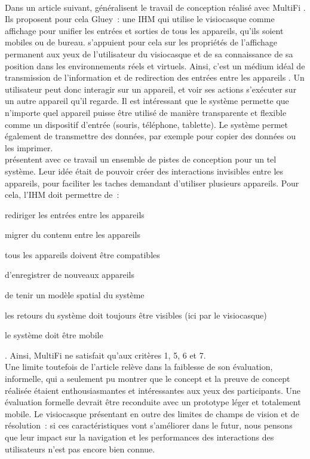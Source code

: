 \paragraph*{}
Dans un article suivant, \cite{SerranoEnsYangEtAl2015} généralisent le travail de conception réalisé avec MultiFi \citep{GrubertHeinischQuigleyEtAl2015}. Ils proposent pour cela Gluey~: une IHM qui utilise le visiocasque comme affichage pour unifier les entrées et sorties de tous les appareils, qu'ils soient mobiles ou de bureau. \citeauthor{SerranoEnsYangEtAl2015} s'appuient pour cela sur les propriétés de l'affichage permanent aux yeux de l'utilisateur du visiocasque et de sa connaissance de sa position dans les environnements réels et virtuels. Ainsi, c'est un médium idéal de transmission de l'information et de redirection des entrées entre les appareils .
Un utilisateur peut donc interagir sur un appareil, et voir ses actions s'exécuter sur un autre appareil qu'il regarde. Il est intéressant que le système permette que n'importe quel appareil puisse être utilisé de manière transparente et flexible comme un dispositif d'entrée (souris, téléphone, tablette). Le système permet également de transmettre des données, par exemple pour copier des données ou les imprimer.\\
\citeauthor{SerranoEnsYangEtAl2015} présentent avec ce travail un ensemble de pistes de conception pour un tel système. Leur idée était de pouvoir créer des interactions invisibles entre les appareils, pour faciliter les taches demandant d'utiliser plusieurs appareils. Pour cela, l'IHM doit permettre de~: 
\begin{enumerate*}
	\item rediriger les entrées entre les appareils
	\item migrer du contenu entre les appareils
	\item tous les appareils doivent être compatibles
	\item d'enregistrer de nouveaux appareils
	\item de tenir un modèle spatial du système
	\item les retours du système doit toujours être visibles (ici par le visiocasque)
	\item le système doit être mobile
\end{enumerate*}. Ainsi, MultiFi \citep{GrubertHeinischQuigleyEtAl2015} ne satisfait qu'aux critères 1, 5, 6 et 7.\\
Une limite toutefois de l'article relève dans la faiblesse de son évaluation, informelle, qui a seulement pu montrer que le concept et la preuve de concept réalisée étaient enthousiasmantes et intéressantes aux yeux des participants. Une évaluation formelle devrait être reconduite avec un prototype léger et totalement mobile. Le visiocasque présentant en outre des limites de champs de vision et de résolution~: si ces caractéristiques vont s'améliorer dans le futur, nous pensons que leur impact sur la navigation et les performances des interactions des utilisateurs n'est pas encore bien connue.

